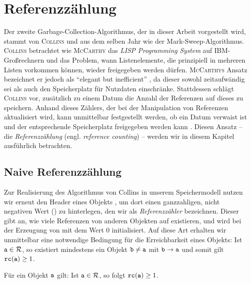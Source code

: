 \chapter{Referenzzählung}
\label{cha:reference-counting}
Der zweite Garbage-Collection-Algorithmus, der in dieser Arbeit vorgestellt wird, stammt von \textsc{Collins} und aus dem selben Jahr wie der Mark-Sweep-Algorithmus.
\textsc{Collins} betrachtet wie \textsc{McCarthy} das \textit{LISP Programming System} auf IBM-Großrechnern und das Problem, wann Listenelemente, die prinzipiell in mehreren Listen vorkommen können, wieder freigegeben werden dürfen.
\textsc{McCarthys} Ansatz bezeichnet er jedoch als \enquote{elegant but inefficient} \cite[S. 655]{collins1960}, da dieser sowohl zeitaufwändig sei als auch den Speicherplatz für Nutzdaten einschränke.
Stattdessen schlägt \textsc{Collins} vor, zusätzlich zu einem Datum die Anzahl der Referenzen auf dieses zu speichern.
Anhand dieses Zählers, der bei der Manipulation von Referenzen aktualisiert wird, kann unmittelbar festgestellt werden, ob ein Datum verwaist ist und der entsprechende Speicherplatz freigegeben werden kann \cite[S. 656f]{collins1960}.
Diesen Ansatz -- die \textit{Referenzzählung} (engl. \textit{reference counting}) -- werden wir in diesem Kapitel ausführlich betrachten.




\section{Naive Referenzzählung}
\label{sec:naive-rc}
Zur Realisierung des Algorithmus von Collins in unserem Speichermodell nutzen wir erneut den Header eines Objekts , um dort einen ganzzahligen, nicht negativen Wert () zu hinterlegen, den wir als \textit{Referenzzähler} bezeichnen.
Dieser gibt an, wie viele Referenzen von anderen Objekten auf  existieren, und wird bei der Erzeugung von  mit dem Wert $0$ initialisiert.
Auf diese Art erhalten wir unmittelbar eine notwendige Bedingung für die Erreichbarkeit eines Objekts:
Ist $\texttt{a} \in \mathcal{R}$, so existiert mindestens ein Objekt $\texttt{b} \neq \texttt{a}$ mit $\texttt{b} \rightarrow \texttt{a}$ und somit gilt $\texttt{rc}(\texttt{a}) \geq 1$.

\begin{mybox}
\begin{lemma}
\label{lemma:notwendig-rc}
	Für ein Objekt $\texttt{a}$ gilt: Ist $\texttt{a} \in \mathcal{R}$, so folgt $\texttt{rc}(\texttt{a}) \geq 1$.
\end{lemma}
\end{mybox}

